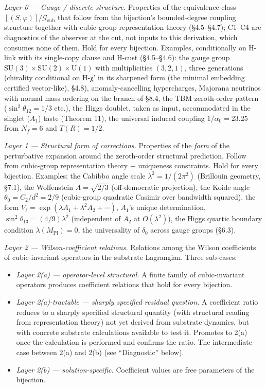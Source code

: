 \documentclass[
]{article}
\providecommand{\tightlist}{%
  \setlength{\itemsep}{0pt}\setlength{\parskip}{0pt}}
\begin{document}
\emph{Layer 0 --- Gauge / discrete structure.} Properties of the
equivalence class \([(S, \varphi)]/\mathcal{G}_{\text{sub}}\) that
follow from the bijection's bounded-degree coupling structure together
with cubic-group representation theory (§4.5--§4.7); C1--C4 are
diagnostics of the observer at the cut, not inputs to this derivation,
which consumes none of them. Hold for every bijection. Examples,
conditionally on H-link with its single-copy clause and H-cust
(§4.5--§4.6): the gauge group
\(\mathrm{SU}(3) \times \mathrm{SU}(2) \times \mathrm{U}(1)\) with
multiplicities \((3, 2, 1)\), three generations (chirality conditional
on H-χ' in its sharpened form (the minimal embedding certified
vector-like), §4.8), anomaly-cancelling hypercharges, Majorana neutrinos
with normal mass ordering on the branch of §8.4, the TBM zeroth-order
pattern (\(\sin^2\theta_{12} = 1/3\) etc.), the Higgs doublet, taken as
input, accommodated in the singlet (\(A_1\)) taste (Theorem 11), the
universal induced coupling \(1/\alpha_0 = 23.25\) from \(N_f = 6\) and
\(T(R) = 1/2\).

\emph{Layer 1 --- Structural form of corrections.} Properties of the
\emph{form} of the perturbative expansion around the zeroth-order
structural prediction. Follow from cubic-group representation theory +
uniqueness constraints. Hold for every bijection. Examples: the Cabibbo
angle scale \(\lambda^2 = 1/(2\pi^2)\) (Brillouin geometry, §7.1), the
Wolfenstein \(A = \sqrt{2/3}\) (off-democratic projection), the Koide
angle \(\theta_0 = C_2/d^2 = 2/9\) (cubic-group quadratic Casimir over
bandwidth squared), the form
\(V_\ell = \exp(\lambda A_1 + \lambda^2 A_2 + \cdots)\), \(A_1\)'s
unique determination, \(\sin^2\theta_{13} = (4/9)\lambda^2\)
(independent of \(A_2\) at \(O(\lambda^2)\)), the Higgs quartic boundary
condition \(\lambda(M_{\text{Pl}}) = 0\), the universality of
\(\delta_0\) across gauge groups (§6.3).

\emph{Layer 2 --- Wilson-coefficient relations.} Relations among the
Wilson coefficients of cubic-invariant operators in the substrate
Lagrangian. Three sub-cases:

\begin{itemize}
\tightlist
\item
  \emph{Layer 2(a) --- operator-level structural.} A finite family of
  cubic-invariant operators produces coefficient relations that hold for
  every bijection.
\item
  \emph{Layer 2(a)-tractable --- sharply specified residual question.} A
  coefficient ratio reduces to a sharply specified structural quantity
  (with structural reading from representation theory) not yet derived
  from substrate dynamics, but with concrete substrate calculations
  available to test it. Promotes to 2(a) once the calculation is
  performed and confirms the ratio. The intermediate case between 2(a)
  and 2(b) (see ``Diagnostic'' below).
\item
  \emph{Layer 2(b) --- solution-specific.} Coefficient values are free
  parameters of the bijection.
\end{itemize}
\end{document}
